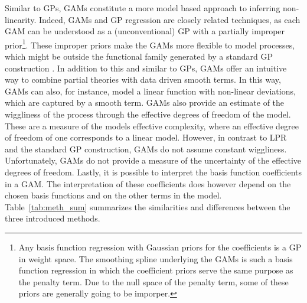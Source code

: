 \documentclass[man, floatsintext]{apa7}
\begin{document}
Similar to GPs, GAMs constitute a more model based approach to inferring
non-linearity. Indeed, GAMs and GP regression are closely related techniques,
as each GAM can be understood as a (unconventional) GP with a partially
improper prior\footnote{Any basis function regression with Gaussian priors for
  the coefficients is a GP in weight space. The smoothing spline underlying the
  GAMs is such a basis function regression in which the coefficient priors
  serve
  the same purpose as the penalty term. Due to the null space of the penalty
  term, some of these priors are generally going to be imporper.}. These
improper
priors make the GAMs more flexible to model processes, which might be outside
the functional family generated by a standard GP construction
\parencite{wahba_improper_1978}. In addition to this and similar to GPs, GAMs
offer an intuitive way to combine partial theories with data driven smooth
terms. In this way, GAMs can also, for instance, model a linear function with
non-linear deviations, which are captured by a smooth term. GAMs also provide
an estimate of the wiggliness of the process through the effective degrees of
freedom of the model. These are a measure of the models effective complexity,
where an effective degree of freedom of one corresponds to a linear model.
However, in contrast to LPR and the standard GP construction, GAMs do not
assume constant wiggliness. Unfortunately, GAMs do not provide a measure of the
uncertainty of the effective degrees of freedom. Lastly, it is possible to
interpret the basis function coefficients in a GAM\@. The interpretation of
these coefficients does however depend on the chosen basis functions and on the
other terms in the model. Table~\ref{tab:meth_sum} summarizes the
similarities and differences between the three introduced methods.
\end{document}
